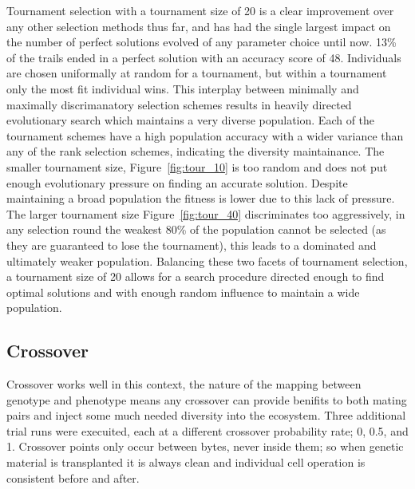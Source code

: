 Tournament selection with a tournament size of 20 is a clear improvement over
any other selection methods thus far, and has had the single largest impact
on the number of perfect solutions evolved of any parameter choice until
now. 13\% of the trails ended in a perfect solution with an accuracy score of 48.
Individuals are chosen uniformally at random for a tournament, but within a
tournament only the most fit individual wins. This interplay between minimally
and maximally discrimanatory selection schemes results in heavily directed evolutionary
search which maintains a very diverse population. Each of the tournament schemes
have a high population accuracy with a wider variance than any of the rank
selection schemes, indicating the diversity maintainance. The smaller tournament
size, Figure~\ref{fig:tour_10} is too random and does not put enough evolutionary
pressure on finding an accurate solution.
Despite maintaining a broad population the fitness is lower due to this lack of
pressure. The larger tournament size Figure~\ref{fig:tour_40} discriminates too
aggressively, in any selection round the weakest 80\% of the population cannot
be selected (as they are guaranteed to lose the tournament), this leads to a
dominated and ultimately weaker population.
Balancing these two facets of tournament selection, a tournament size
of 20 allows for a search procedure directed enough to find optimal solutions
and with enough random influence to maintain a wide population.

\subsection{Crossover}
Crossover works well in this context, the nature of the mapping between genotype
and phenotype means any crossover can provide benifits to both mating pairs and
inject some much needed diversity into the ecosystem. Three additional trial runs
were execuited, each at a different crossover probability rate; 0, 0.5, and 1.
Crossover points only occur between bytes, never inside them; so
when genetic material is transplanted it is always clean and individual cell
operation is consistent before and after.

